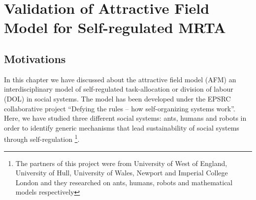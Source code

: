 \chapter{Validation of Attractive Field Model for Self-regulated MRTA}
\label{afm}
\section{Motivations}
\label{afm:motivations}
In this chapter we have discussed about the attractive field model (AFM) \cite{Arcaute+2008} an interdisciplinary model of self-regulated task-allocation or division of labour (DOL) in social systems. The model has been developed under the EPSRC collaborative project ``Defying the rules – how self-organizing systems work''. Here,  we have studied three different social systems: ants, humans and robots in order to identify generic mechanisms that lead sustainability of social systems through self-regulation \footnote{The partners of this project were from University of West of England, University of Hull, University of Wales, Newport and Imperial College London and they researched on ants, humans, robots and mathematical models respectively}.
